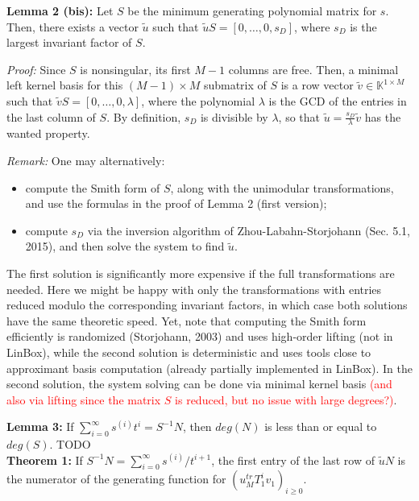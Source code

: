 \documentclass[12pt]{article}
\newcommand{\todo}[1]{\textcolor{red}{#1}}
\begin{document}
\noindent\textbf{Lemma 2 (bis):}
Let $S$ be the minimum generating polynomial matrix for $s$.  Then, there
exists a vector $\tilde{u}$ such that $\tilde{u} S = [0, \ldots, 0, s_D]$,
where $s_D$ is the largest invariant factor of $S$.

\medskip\noindent\textit{Proof:} Since $S$ is nonsingular, its first $M-1$
columns are free. Then, a minimal left kernel basis for this $(M-1) \times M$
submatrix of $S$ is a row vector $\tilde{v} \in \mathbb{K}^{1 \times M}$ such
that $\tilde{v} S = [0,\ldots,0,\lambda]$, where the polynomial $\lambda$ is
the GCD of the entries in the last column of $S$. By definition, $s_D$ is
divisible by $\lambda$, so that $\tilde{u} = \frac{s_D}{\lambda}\tilde{v}$ has
the wanted property.

\medskip\noindent\textit{Remark:}
One may alternatively:
\begin{itemize}
  \item compute the Smith form of $S$, along with the unimodular
    transformations, and use the formulas in the proof of Lemma 2 (first
    version);
  \item compute $s_D$ via the inversion algorithm of Zhou-Labahn-Storjohann
    (Sec. 5.1, 2015), and then solve the system to find $\tilde{u}$.
\end{itemize}
The first solution is significantly more expensive if the full transformations
are needed. Here we might be happy with only the transformations with entries
reduced modulo the corresponding invariant factors, in which case both
solutions have the same theoretic speed. Yet, note that computing the Smith
form efficiently is randomized (Storjohann, 2003) and uses high-order lifting
(not in LinBox), while the second solution is deterministic and uses tools
close to approximant basis computation (already partially implemented in
LinBox). In the second solution, the system solving can be done via minimal
kernel basis \todo{(and also via lifting since the matrix $S$ is reduced, but
no issue with large degrees?)}.

\bigskip
\noindent\textbf{Lemma 3:} If $\sum_{i = 0}^{\infty} s^{(i)} t^i = S^{-1}N$, then $deg(N)$ is
less than or equal to $deg(S)$. TODO\\

\noindent\textbf{Theorem 1:} If 
$S^{-1}N = \sum_{i=0}^{\infty} s^{(i)}/t^{i+1}$, the first entry
of the last row of $\tilde{u} N$ is  the numerator of the generating function for 
$(u_{M}^{tr} T_1^i v_{1})_{i \ge 0}$.\\
\end{document}
